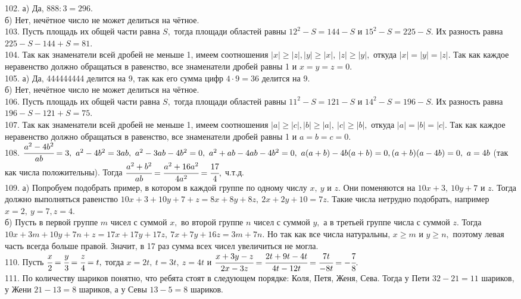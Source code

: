 102. а) Да, $888:3=296.$\\
б) Нет, нечётное число не может делиться на чётное.\\
103. Пусть площадь их общей части равна $S,$ тогда площади областей равны $12^2-S=144-S$ и $15^2-S=225-S.$ Их разность равна $225-S-144+S=81.$\\
104. Так как знаменатели всей дробей не меньше 1, имеем соотношения $|x|\geqslant |z|, |y|\geqslant |x|,\ |z|\geqslant |y|,$ откуда
$|x|=|y|=|z|.$ Так как каждое неравенство должно обращаться в равенство, все знаменатели дробей равны 1 и $x=y=z=0.$\\
105. а) Да, 444444444 делится на 9, так как его сумма цифр $4\cdot9=36$ делится на 9.\\
б) Нет, нечётное число не может делиться на чётное.\\
106. Пусть площадь их общей части равна $S,$ тогда площади областей равны $11^2-S=121-S$ и $14^2-S=196-S.$ Их разность равна $196-S-121+S=75.$\\
107. Так как знаменатели всей дробей не меньше 1, имеем соотношения $|a|\geqslant |c|, |b|\geqslant |a|,\ |c|\geqslant |b|,$ откуда
$|a|=|b|=|c|.$ Так как каждое неравенство должно обращаться в равенство, все знаменатели дробей равны 1 и $a=b=c=0.$\\
108. $\cfrac{a^2-4b^2}{ab}=3,\ a^2-4b^2=3ab,\ a^2-3ab-4b^2=0,\ a^2+ab-4ab-4b^2=0,\ a(a+b)-4b(a+b)=0, (a+b)(a-4b)=0,\ a=4b$ (так как числа положительны). Тогда
$\cfrac{a^2+b^2}{ab}=\cfrac{a^2+16a^2}{4a^2}=\cfrac{17}{4},$ ч.т.д.\\
109. а) Попробуем подобрать пример, в котором в каждой группе по одному числу $x,\ y$ и $z.$ Они поменяются на $10x+3,\ 10y+7$ и $z.$ Тогда должно выполняться равенство $10x+3+10y+7+z=8x+8y+8z,\ 2x+2y+10=7z.$ Такие числа нетрудно подобрать, например $x=2,\ y=7, z=4.$\\
б) Пусть в первой группе $m$ чисел с суммой $x,$ во второй группе $n$ чисел с суммой $y,$ а в третьей группе числа с суммой $z.$ Тогда
$10x+3m+10y+7n+z=17x+17y+17z,\ 7x+7y+16z=3m+7n.$ Но так как все числа натуральны, $x\geqslant m$ и $y\geqslant n,$ поэтому левая часть всегда больше правой. Значит, в 17 раз сумма всех чисел увеличиться не могла.\\
110. Пусть $\cfrac{x}{2}=\cfrac{y}{3}=\cfrac{z}{4}=t,$ тогда $x=2t,\ t=3t,\ z=4t$ и $\cfrac{x+3y-z}{2x-3z}=\cfrac{2t+9t-4t}{4t-12t}=\cfrac{7t}{-8t}=-\cfrac{7}{8}.$\\
111. По количеству шариков понятно, что ребята стоят в следующем порядке: Коля, Петя, Женя, Сева. Тогда у Пети $32-21=11$ шариков, у Жени $21-13=8$ шариков, а у Севы $13-5=8$ шариков.\\
